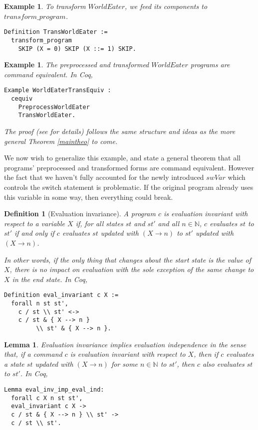 \documentclass[compsoc,conference,a4paper,10pt,times]{IEEEtran}
\newtheorem{lemma}[theorem]{Lemma}
\newtheorem{defin}[theorem]{Definition}
\newtheorem{example}[theorem]{Example}
\begin{document}
\begin{example}
To transform $WorldEater$, we feed its components to $transform\_program$.
\begin{verbatim}
Definition TransWorldEater := 
  transform_program 
    SKIP (X = 0) SKIP (X ::= 1) SKIP.
\end{verbatim}
\end{example}

\begin{example}\label{WE_example}
The preprocessed and transformed $WorldEater$ programs are command equivalent.  In Coq,
\begin{verbatim}
Example WorldEaterTransEquiv : 
  cequiv 
    PreprocessWorldEater 
    TransWorldEater.
\end{verbatim}
The proof (see \cite{Weyun} for details) follows the same structure and ideas as the more general Theorem \ref{maintheo} to come.
\end{example}

We now wish to generalize this example, and state a general theorem that all programs' preprocessed and transformed forms are command equivalent. However the fact that we haven't fully accounted for the newly introduced $swVar$ which controls the switch statement is problematic. If the original program already uses this variable in some way, then everything could break.

\begin{defin}[Evaluation invariance]
A program $c$ is \emph{evaluation invariant} with respect to a variable $X$ if, for all states $st$ and $st'$ and all $n \in \mathbb{N}$, $c$ evaluates $st$ to $st'$ if and only if $c$ evaluates $st$ updated with $(X \longrightarrow n)$ to $st'$ updated with $(X\longrightarrow n)$.
\par In other words, if the only thing that changes about the start state is the value of $X$, there is no impact on evaluation with the sole exception of the same change to $X$ in the end state.  In Coq,
\begin{verbatim}
Definition eval_invariant c X := 
  forall n st st', 
    c / st \\ st' <-> 
    c / st & { X --> n } 
         \\ st' & { X --> n }.
\end{verbatim}
\end{defin}

\begin{lemma}\label{independence}
Evaluation invariance implies evaluation independence in the sense that, if a command $c$ is evaluation invariant with respect to $X$, then if $c$ evaluates a state $st$ updated with $(X\longrightarrow n)$ for some $n \in \mathbb{N}$ to $st'$, then $c$ also evaluates $st$ to $st'$.  In Coq,
\begin{verbatim}
Lemma eval_inv_imp_eval_ind: 
  forall c X n st st', 
  eval_invariant c X ->
  c / st & { X --> n } \\ st' -> 
  c / st \\ st'.
\end{verbatim}
\end{lemma}
\end{document}
